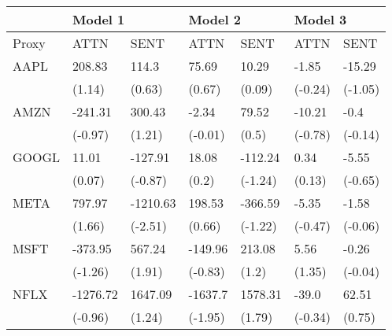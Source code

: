 \begin{tabular}{lllllll}
\toprule
{} & \multicolumn{2}{l}{Model 1} & \multicolumn{2}{l}{Model 2} & \multicolumn{2}{l}{Model 3} \\
\midrule
Proxy &      ATTN &      SENT &     ATTN &     SENT &     ATTN &     SENT \\
AAPL  &    208.83 &     114.3 &    75.69 &    10.29 &    -1.85 &   -15.29 \\
      &    (1.14) &    (0.63) &   (0.67) &   (0.09) &  (-0.24) &  (-1.05) \\
AMZN  &   -241.31 &    300.43 &    -2.34 &    79.52 &   -10.21 &     -0.4 \\
      &   (-0.97) &    (1.21) &  (-0.01) &    (0.5) &  (-0.78) &  (-0.14) \\
GOOGL &     11.01 &   -127.91 &    18.08 &  -112.24 &     0.34 &    -5.55 \\
      &    (0.07) &   (-0.87) &    (0.2) &  (-1.24) &   (0.13) &  (-0.65) \\
META  &    797.97 &  -1210.63 &   198.53 &  -366.59 &    -5.35 &    -1.58 \\
      &    (1.66) &   (-2.51) &   (0.66) &  (-1.22) &  (-0.47) &  (-0.06) \\
MSFT  &   -373.95 &    567.24 &  -149.96 &   213.08 &     5.56 &    -0.26 \\
      &   (-1.26) &    (1.91) &  (-0.83) &    (1.2) &   (1.35) &  (-0.04) \\
NFLX  &  -1276.72 &   1647.09 &  -1637.7 &  1578.31 &    -39.0 &    62.51 \\
      &   (-0.96) &    (1.24) &  (-1.95) &   (1.79) &  (-0.34) &   (0.75) \\
\bottomrule
\end{tabular}
